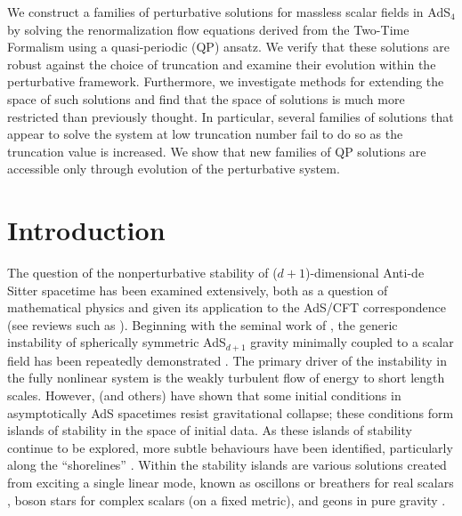 \documentclass[../PhD.tex]{subfiles}
\begin{document}
\bigskip

We construct a families of perturbative solutions for massless scalar fields in AdS$_4$ by solving the renormalization flow equations derived from the Two-Time Formalism using a quasi-periodic (QP) ansatz. We verify that these solutions are robust against the choice of truncation and examine their evolution within the perturbative framework. Furthermore, we investigate methods for extending the space of such solutions and find that the space of solutions is much more restricted than previously thought. In particular, several families of solutions that appear to solve the system at low truncation number fail to do so as the truncation value is increased. We show that new families of QP solutions are accessible only through evolution of the perturbative system.


\section{Introduction}

The question of the nonperturbative stability of ($d+1$)-dimensional Anti-de Sitter spacetime has been examined extensively, both as a question of mathematical physics and given its application to the AdS/CFT correspondence (see reviews such as \cite{1708.05600}). Beginning with the seminal work of \cite{1104.3702}, the generic instability of spherically symmetric AdS$_{d+1}$ gravity minimally coupled to a scalar field has been repeatedly demonstrated \cite{1108.4539, 1106.2339, 1110.5823, 1210.0890, 1510.02592}. The primary driver of the instability in the fully nonlinear system is the weakly turbulent flow of energy to short length scales. However, \cite{1303.3186, 1307.2875, 1403.5434} (and others) have shown that some initial conditions in asymptotically AdS spacetimes resist gravitational collapse; these conditions form islands of stability in the space of initial data. As these islands of stability continue to be explored, more subtle behaviours have been identified, particularly along the ``shorelines'' \cite{1508.02709, 1711.00454,1602.03535, 1803.02830}. Within the stability islands are various solutions created from exciting a single linear mode, known as oscillons or breathers for real scalars \cite{1104.3702,1210.0890,1303.3186,1503.07746}, boson stars for complex scalars (on a fixed metric)\cite{1304.4166,1307.2875}, and geons in pure gravity \cite{1109.1825,1208.5772}.
\end{document}
